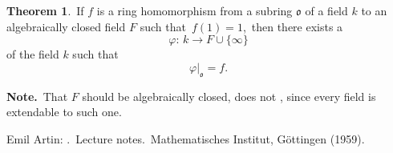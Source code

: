 \documentclass[12pt]{article}
\theoremstyle{definition}
\newtheorem*{thmplain}{Theorem}
\begin{document}
\begin{thmplain}
\,If $f$ is a ring homomorphism from a subring $\mathfrak{o}$ of a field $k$ to an algebraically closed field $F$ such that \,$f(1) = 1$, \,then there exists a  
              $$\varphi: \,k\to F\cup\{\infty\}$$
of the field $k$ such that
                  $$\varphi|_\mathfrak{o} = f.$$
\end{thmplain}

\textbf{Note.} \,That $F$ should be algebraically closed, does not , since every field is extendable to such one.

\begin{thebibliography}{8}
Emil Artin: {\em {}}. \,Lecture notes. \,Mathematisches Institut, G\"ottingen (1959).
\end{thebibliography}
\end{document}
